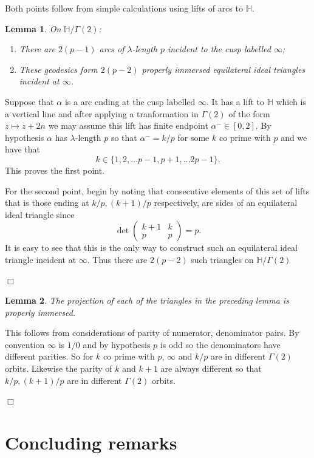 \documentclass[12pt]{amsart}
\theoremstyle{plain}
\newtheorem{lemma}{Lemma}[section]
\theoremstyle{definition}
\def\HH{\mathbb{H}}
\def\xx{\HH/g2}
\def\g2{\Gamma(2)}
\def\xx{\HH/\g2}
\begin{document}
Both points follow from simple calculations using lifts of
arcs to $\HH$.


\begin{lemma}\label{counting}
On $\xx$:
\begin{enumerate}
\item There are $2(p-1)$ arcs of $\lambda$-length $p$ incident to the cusp labelled  $\infty$;
\item These geodesics form $2(p-2)$ properly  immersed equilateral ideal triangles incident at $\infty$.
\end{enumerate}
\end{lemma}

\proof Suppose that $\alpha$ is a arc ending at the cusp labelled 
$\infty$.
It has a lift to $\HH$ which is a vertical line and after 
applying a tranformation in $\Gamma(2)$ of the 
form $z \mapsto z + 2n$ we may assume this lift has finite endpoint $\alpha^- \in [0,2]$.
By hypothesis $\alpha$ has  $\lambda$-length $p$ 
so that $\alpha^- = k/p$ for some $k$ co prime with $p$
and we have that
$$ k \in \{1,2,\ldots p-1, p+ 1, \ldots 2p -1 \}.$$
This proves the first point.

For the second point, begin by  noting that consecutive elements of this set of lifts
that is those ending at $k/p, (k+1)/p$ respectively, are sides of
an equilateral ideal triangle since
$$\det \begin{pmatrix}
k + 1 & k \\ p & p 
\end{pmatrix} = p.$$
It is easy to see that this is the only way to construct such
an  equilateral ideal triangle incident at $\infty$.
Thus there are $2(p-2)$ such triangles on $\xx$

\hfill $\Box$


\begin{lemma}\label{proper}
The projection of each of the triangles in the preceding lemma
is properly immersed.
\end{lemma}

\proof This follows from considerations of parity of numerator, denominator pairs.
By convention $\infty$ is $1/0$ and 
by hypothesis $p$ is odd so the denominators have different parities. So for $k$ co prime with $p$, 
$\infty$ and $k/p$ are in different $\Gamma(2)$ orbits.
Likewise the parity of $k$ and $k+1$ are always different
so that $k/p, (k+1)/p$ are in different $\Gamma(2)$ orbits.

\hfill $\Box$


\section{Concluding remarks}
\end{document}
